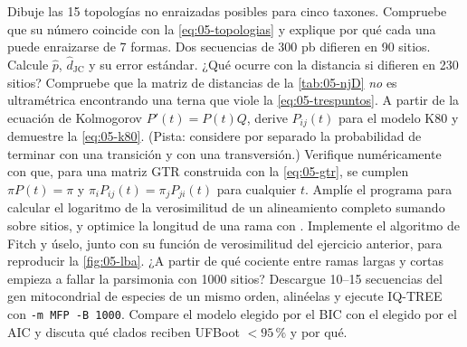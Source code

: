 \begin{ejercicios}
 Dibuje las 15 topologías no enraizadas posibles para cinco taxones. Compruebe que su número coincide con la \cref{eq:05-topologias} y explique por qué cada una puede enraizarse de 7 formas.
 Dos secuencias de 300 pb difieren en 90 sitios. Calcule $\hat p$, $\hat d_{\text{JC}}$ y su error estándar. ¿Qué ocurre con la distancia si difieren en 230 sitios?
 Compruebe que la matriz de distancias de la \cref{tab:05-njD} \emph{no} es ultramétrica encontrando una terna que viole la \cref{eq:05-trespuntos}.
 A partir de la ecuación de Kolmogorov $P'(t)=P(t)Q$, derive $P_{ij}(t)$ para el modelo K80 y demuestre la \cref{eq:05-k80}. (Pista: considere por separado la probabilidad de terminar con una transición y con una transversión.)
 Verifique numéricamente con  que, para una matriz GTR construida con la \cref{eq:05-gtr}, se cumplen $\pi P(t)=\pi$ y $\pi_iP_{ij}(t)=\pi_jP_{ji}(t)$ para cualquier $t$.
 Amplíe el programa  para calcular el logaritmo de la verosimilitud de un alineamiento completo sumando sobre sitios, y optimice la longitud de una rama con .
 Implemente el algoritmo de Fitch y úselo, junto con su función de verosimilitud del ejercicio anterior, para reproducir la \cref{fig:05-lba}. ¿A partir de qué cociente entre ramas largas y cortas empieza a fallar la parsimonia con \num{1000} sitios?
 Descargue 10–15 secuencias del gen mitocondrial  de especies de un mismo orden, alinéelas y ejecute IQ-TREE con \texttt{-m MFP -B 1000}. Compare el modelo elegido por el BIC con el elegido por el AIC y discuta qué clados reciben UFBoot $<95\,\%$ y por qué.
\end{ejercicios}

